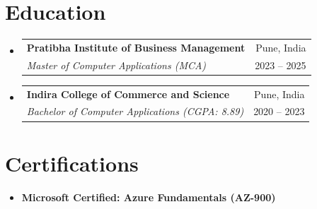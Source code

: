 \documentclass[letterpaper,11pt]{article}
\makeatletter
\newcommand{\resumeItem}[1]{\item\small{{#1 \vspace{-2pt}}}}
\newcommand{\resumeSubheading}[4]{
  \vspace{-2pt}\item
    \begin{tabular*}{0.97\textwidth}[t]{l@{\extracolsep{\fill}}r}
      \textbf{#1} & #2 \\
      \textit{\small#3} & \small #4 \\
    \end{tabular*}\vspace{-7pt}
}
\newcommand{\resumeSubItem}[1]{\resumeItem{#1}\vspace{-2pt}}
\newcommand{\resumeSubHeadingListStart}{\begin{itemize}[leftmargin=0.15in, label={}]}
\newcommand{\resumeSubHeadingListEnd}{\end{itemize}}
\makeatother
\begin{document}
\section{Education}
\resumeSubHeadingListStart
  \resumeSubheading
    {Pratibha Institute of Business Management}{Pune, India}
    {Master of Computer Applications (MCA)}{2023 -- 2025}
  \resumeSubheading
    {Indira College of Commerce and Science}{Pune, India}
    {Bachelor of Computer Applications (CGPA: 8.89)}{2020 -- 2023}
\resumeSubHeadingListEnd

\section{Certifications}
\resumeSubHeadingListStart
  \resumeSubItem{\textbf{Microsoft Certified: Azure Fundamentals (AZ-900)}}
\resumeSubHeadingListEnd
\end{document}
